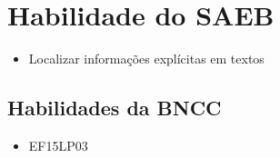 \section*{Habilidade do SAEB}

\begin{itemize}
	\item Localizar informações explícitas em textos
\end{itemize}

\subsection{Habilidades da BNCC}

\begin{itemize}
\item EF15LP03
\end{itemize}

